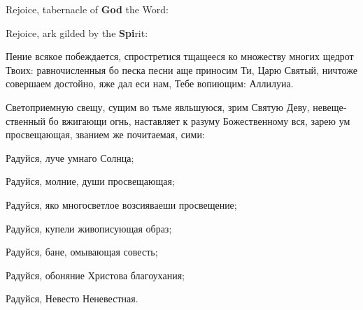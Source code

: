 

\PeopleRejoice Rejoice, tabernacle of \textbf{God} the Word:


Rejoice, ark gilded by the \textbf{Spi}rit:


\pagebreak

\begin{russian}


  \Ierei Пение всякое побеждается, спростретися тщащееся ко множеству многих щедрот Твоих: равночисленныя бо песка песни аще приносим Ти, Царю Святый, ничтоже совершаем достойно, яже дал еси нам, Тебе вопиющим: Аллилуиа.


  \Ierei Светоприемную свещу, сущим во тьме явльшуюся, зрим Святую Деву, невещественный бо вжигающи огнь, наставляет к разуму Божественному вся, зарею ум просвещающая, званием же почитаемая, сими:

  Радуйся, луче умнаго Солнца;


  Радуйся, молние, души просвещающая;


  Радуйся, яко многосветлое возсияваеши просвещение;


  Радуйся, купели живописующая образ;


  Радуйся, бане, омывающая совесть;


  Радуйся, обоняние Христова благоухания;


  Радуйся, Невесто Неневестная.



\end{russian}
